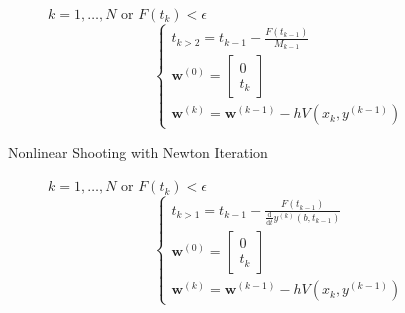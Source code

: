 \documentclass[8pt]{article}
\newcommand{\dd}[1]{\mathrm{d}{#1}}
\newcommand{\ddt}[1]{\frac{\dd{}}{\dd{#1}}}
\begin{document}
\begin{multicols}{2}
\begin{description}
    $k=1,\ldots,N$ or $F(t_k)<\epsilon$
    \begin{equation*}
      \left\{
        \begin{array}{c}
          t_{k>2}=t_{k-1}-\frac{F(t_{k-1})}{M_{k-1}} \\
          \mathbf{w}^{(0)} =
          \left[\begin{smallmatrix}
            0 \\ t_k
          \end{smallmatrix}\right] \\
          \mathbf{w}^{(k)} = \mathbf{w}^{(k-1)} - hV(x_k,y^{(k-1)})
        \end{array}
      \right.
    \end{equation*}

  \item[Nonlinear Shooting with Newton Iteration]
    $k=1,\ldots,N$ or $F(t_k)<\epsilon$
    \begin{equation*}
      \left\{
        \begin{array}{c}
          t_{k>1}=t_{k-1}-\frac{F(t_{k-1})}{\ddt{t}y^{(k)}(b,t_{k-1})} \\
          \mathbf{w}^{(0)} =
          \left[\begin{smallmatrix}
            0 \\ t_k
          \end{smallmatrix}\right] \\
          \mathbf{w}^{(k)} = \mathbf{w}^{(k-1)} - hV(x_k,y^{(k-1)})
        \end{array}
      \right.
    \end{equation*}


\end{description}
\end{multicols}
\end{document}
